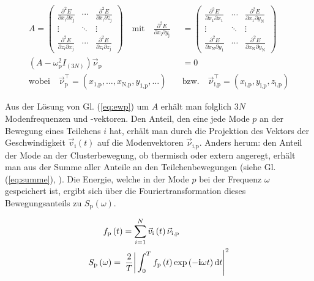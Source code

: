 \documentclass[numbers=noenddot,a4paper]{scrartcl}
\newcommand{\diff}{\textnormal{d}}
\newcommand{\ix}[1]{_\text{#1}}
\newcommand{\imag}{\mathbf{i}}
\begin{document}
						\begin{align}
							A=
							\begin{pmatrix}
							\frac{\partial^2 E}{\partial x\ix{i} \partial x\ix{j}} & \cdots & \frac{\partial^2 E}{\partial x\ix{i} \partial z\ix{j}} \\ 
							\vdots & \ddots & \vdots \\ 
							\frac{\partial^2 E}{\partial z\ix{i} \partial x\ix{j}} & \cdots & \frac{\partial^2 E}{\partial z\ix{i} \partial z\ix{j}}
							\end{pmatrix} 
							\quad \text{mit} \quad \frac{\partial^2 E}{\partial x\ix{i}\partial y\ix{j}}&=
							\begin{pmatrix}
							\frac{\partial^2 E}{\partial x\ix{1} \partial x\ix{1}} & \cdots & \frac{\partial^2 E}{\partial x\ix{1} \partial y\ix{N}} \\ 
							\vdots & \ddots & \vdots \\ 
							\frac{\partial^2 E}{\partial x\ix{N} \partial y\ix{1}} & \cdots & \frac{\partial^2 E}{\partial x\ix{N} \partial y\ix{N}}
							\end{pmatrix}
							\label{eq:matrix} \\
							\left(A-\omega\ix{p}^2I_{(3N)}\right)\vec{\nu}\ix{p}&=0 \label{eq:ewp} \\ 
							\text{wobei} \quad \vec{\nu}\ix{p}^\top=\left(x\ix{1,p},\dots,x\ix{N,p},y\ix{1,p},\dots\right) \quad &\text{bzw.} \quad \vec{\nu}\ix{i,p}^\top=\left(x\ix{i,p},y\ix{i,p},z\ix{i,p}\right) \nonumber
						\end{align}

					Aus der Lösung von Gl. (\ref{eq:ewp}) um $A$ erhält man folglich $3N$ Modenfrequenzen und -vektoren. Den Anteil, den eine jede Mode $p$ an der Bewegung eines Teilchens $i$ hat, erhält man durch die Projektion des Vektors der Geschwindigkeit $\vec{v}\ix{i}\left(t\right)$ auf die Modenvektoren $\vec{\nu}\ix{i,p}$. Anders herum: den Anteil der Mode an der Clusterbewegung, ob thermisch oder extern angeregt, erhält man aus der Summe aller Anteile an den Teilchenbewegungen (siehe Gl. (\ref{eq:summe}), \cite{Melzer03}). Die Energie, welche in der Mode $p$ bei der Frequenz $\omega$ gespeichert ist, ergibt sich über die Fouriertransformation dieses Bewegungsanteils zu $S\ix{p}\left(\omega\right)$.

						\begin{align}
							f\ix{p}&\left(t\right)=\sum_{i=1}^{N}\vec{v}\ix{i}\left(t\right)\vec{\nu}\ix{i,p} \label{eq:summe} \\
							S\ix{p}\left(\omega\right)&=\left.\left.\frac{2}{T}\right|\int_{0}^{T}f\ix{p}\left(t\right)\exp\left(-\imag\omega t\right)\diff t\right|^2 \label{eq:energiedicht}
						\end{align}
\end{document}
